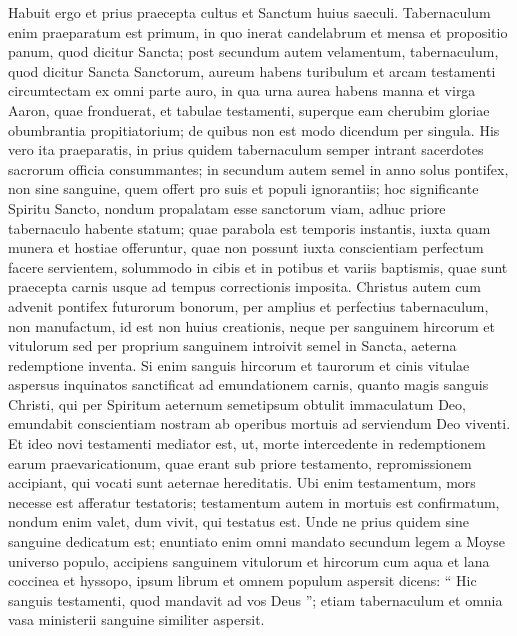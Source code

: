 \begin{biblechapter}
\begin{biblechapter}
\begin{biblechapter}
\begin{biblechapter}
\begin{biblechapter}
\begin{biblechapter}
\begin{biblechapter}
\begin{biblechapter}
\begin{biblechapter}
\verse Habuit ergo et prius praecepta cultus et Sanctum huius saeculi. 
\verse Tabernaculum enim praeparatum est primum, in quo inerat candelabrum et mensa et propositio panum, quod dicitur Sancta; 
\verse post secundum autem velamentum, tabernaculum, quod dicitur Sancta Sanctorum, 
\verse aureum habens turibulum et arcam testamenti circumtectam ex omni parte auro, in qua urna aurea habens manna et virga Aaron, quae fronduerat, et tabulae testamenti, 
\verse superque eam cherubim gloriae obumbrantia propitiatorium; de quibus non est modo dicendum per singula.
 \verse His vero ita praeparatis, in prius quidem tabernaculum semper intrant sacerdotes sacrorum officia consummantes; 
\verse in secundum autem semel in anno solus pontifex, non sine sanguine, quem offert pro suis et populi ignorantiis; 
\verse hoc significante Spiritu Sancto, nondum propalatam esse sanctorum viam, adhuc priore tabernaculo habente statum; 
\verse quae parabola est temporis instantis, iuxta quam munera et hostiae offeruntur, quae non possunt iuxta conscientiam perfectum facere servientem, 
\verse solummodo in cibis et in potibus et variis baptismis, quae sunt praecepta carnis usque ad tempus correctionis imposita.
 \verse Christus autem cum advenit pontifex futurorum bonorum, per amplius et perfectius tabernaculum, non manufactum, id est non huius creationis, 
\verse neque per sanguinem hircorum et vitulorum sed per proprium sanguinem introivit semel in Sancta, aeterna redemptione inventa. 
\verse Si enim sanguis hircorum et taurorum et cinis vitulae aspersus inquinatos sanctificat ad emundationem carnis, 
\verse quanto magis sanguis Christi, qui per Spiritum aeternum semetipsum obtulit immaculatum Deo, emundabit conscientiam nostram ab operibus mortuis ad serviendum Deo viventi.
 \verse Et ideo novi testamenti mediator est, ut, morte intercedente in redemptionem earum praevaricationum, quae erant sub priore testamento, repromissionem accipiant, qui vocati sunt aeternae hereditatis. 
\verse Ubi enim testamentum, mors necesse est afferatur testatoris; 
\verse testamentum autem in mortuis est confirmatum, nondum enim valet, dum vivit, qui testatus est. 
\verse Unde ne prius quidem sine sanguine dedicatum est; 
\verse enuntiato enim omni mandato secundum legem a Moyse universo populo, accipiens sanguinem vitulorum et hircorum cum aqua et lana coccinea et hyssopo, ipsum librum et omnem populum aspersit 
\verse dicens: “ Hic sanguis testamenti, quod mandavit ad vos Deus ”; 
\verse etiam tabernaculum et omnia vasa ministerii sanguine similiter aspersit. 

\end{biblechapter}
\end{biblechapter}
\end{biblechapter}
\end{biblechapter}
\end{biblechapter}
\end{biblechapter}
\end{biblechapter}
\end{biblechapter}
\end{biblechapter}
